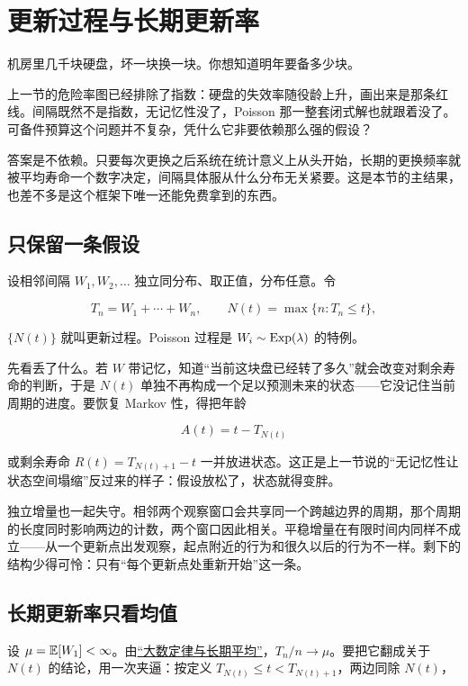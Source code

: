 \section{更新过程与长期更新率}
\label{sec:06-Random-Processes/02-Counting-Processes/04}

机房里几千块硬盘，坏一块换一块。你想知道明年要备多少块。

上一节的危险率图已经排除了指数：硬盘的失效率随役龄上升，画出来是那条红线。间隔既然不是指数，无记忆性没了，Poisson 那一整套闭式解也就跟着没了。可备件预算这个问题并不复杂，凭什么它非要依赖那么强的假设？

答案是不依赖。只要每次更换之后系统在统计意义上从头开始，长期的更换频率就被平均寿命一个数字决定，间隔具体服从什么分布无关紧要。这是本节的主结果，也差不多是这个框架下唯一还能免费拿到的东西。

\subsection{只保留一条假设}

设相邻间隔 \(W_1,W_2,\ldots\) 独立同分布、取正值，分布任意。令

\[
T_n=W_1+\cdots+W_n,
\qquad
N(t)=\max\{n:T_n\le t\},
\]

\(\{N(t)\}\) 就叫更新过程。Poisson 过程是 \(W_i\sim\operatorname{Exp}(\lambda)\) 的特例。

先看丢了什么。若 \(W\) 带记忆，知道``当前这块盘已经转了多久''就会改变对剩余寿命的判断，于是 \(N(t)\) 单独不再构成一个足以预测未来的状态——它没记住当前周期的进度。要恢复 Markov 性，得把年龄

\[
A(t)=t-T_{N(t)}
\]

或剩余寿命 \(R(t)=T_{N(t)+1}-t\) 一并放进状态。这正是上一节说的``无记忆性让状态空间塌缩''反过来的样子：假设放松了，状态就得变胖。

独立增量也一起失守。相邻两个观察窗口会共享同一个跨越边界的周期，那个周期的长度同时影响两边的计数，两个窗口因此相关。平稳增量在有限时间内同样不成立——从一个更新点出发观察，起点附近的行为和很久以后的行为不一样。剩下的结构少得可怜：只有``每个更新点处重新开始''这一条。

\subsection{长期更新率只看均值}

设 \(\mu=\mathbb{E}[W_1]<\infty\)。由\hyperref[sec:05-Probability/08-Limit-Theorems/02]{``大数定律与长期平均''}，\(T_n/n\to\mu\)。要把它翻成关于 \(N(t)\) 的结论，用一次夹逼：按定义 \(T_{N(t)}\le t<T_{N(t)+1}\)，两边同除 \(N(t)\)，

